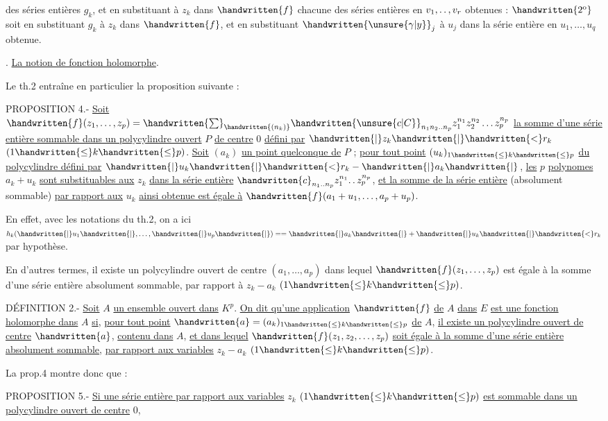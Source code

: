  des séries entières $g_k$, et en substituant à $z_k$ dans $\handwritten{f}$ chacune des séries entières en $v_1,\ldotp\ldotp,v_r$ obtenues : $\handwritten{2^{\mathrm{o}}}$ soit en substituant $g_k$ à $z_k$ dans $\handwritten{f}$, et en substituant $\handwritten{\unsure{\gamma|y}}_j$ à $u_j$ dans la série entière en $u_1,\ldots,u_q$ obtenue.

\uline{}. \uline{La notion de fonction holomorphe}.

Le th.2 entraîne en particulier la proposition suivante :

PROPOSITION 4.- \uline{Soit} $\handwritten{f}(z_1,\ldots,z_p)=\handwritten{\sum}_{\handwritten{(n_k)}}\handwritten{\unsure{c|C}}_{n_1n_2\ldotp\ldotp n_p}z_1^{n_1}z_2^{n_2}\ldots z_p^{n_p}$ \uline{la somme d'une série entière sommable dans un polycylindre ouvert} $P$ \uline{de centre} $0$ \uline{défini par} $\handwritten{|}z_k\handwritten{|}\handwritten{<}r_k$ $(1\handwritten{\leq}k\handwritten{\leq}p)$. \uline{Soit} $(a_k)$ \uline{un point quelconque de} $P$ ; \uline{pour tout point} $(u_k)_{1\handwritten{\leq}k\handwritten{\leq}p}$ \uline{du polycylindre défini par} $\handwritten{|}u_k\handwritten{|}\handwritten{<}r_k-\handwritten{|}a_k\handwritten{|}$, \uline{les} $p$ \uline{polynomes} $a_k+u_k$ \uline{sont substituables aux} $z_k$ \uline{dans la série entière} $\handwritten{c}_{n_1\ldotp\ldotp n_p}z_1^{n_1}\ldotp\ldotp z_p^{n_p}$, \uline{et la somme de la série entière} (absolument sommable) \uline{par rapport aux} $u_k$ \uline{ainsi obtenue est égale à} $\handwritten{f}(a_1+u_1,\ldots,a_p+u_p)$.

En effet, avec les notations du th.2, on a ici $h_k(\handwritten{|}u_1\handwritten{|},\ldots,\handwritten{|}u_p\handwritten{|})==\handwritten{|}a_k\handwritten{|}+\handwritten{|}u_k\handwritten{|}\handwritten{<}r_k$ par hypothèse.

En d'autres termes, il existe un polycylindre ouvert de centre $(a_1,\ldots,a_p)$ dans lequel $\handwritten{f}(z_1,\ldots,z_p)$ est égale à la somme d'une série entière absolument sommable, par rapport à $z_k-a_k$ $(1\handwritten{\leq}k\handwritten{\leq}p)$.

DÉFINITION 2.- \uline{Soit} $A$ \uline{un ensemble ouvert dans} ${K}^{p}$. \uline{On dit qu'une application} $\handwritten{f}$ \uline{de} $A$ \uline{dans} $E$ \uline{est une fonction holomorphe dans} $A$ \uline{si}, \uline{pour tout point} $\handwritten{a}=(a_k)_{1\handwritten{\leq}k\handwritten{\leq}p}$ \uline{de} $A$, \uline{il existe un polycylindre ouvert de centre} $\handwritten{a}$, \uline{contenu dans} $A$, \uline{et dans lequel} $\handwritten{f}(z_1,z_2,\ldots,z_p)$ \uline{soit égale à la somme d'une série entière absolument sommable}, \uline{par rapport aux variables} $z_k-a_k$ $(1\handwritten{\leq}k\handwritten{\leq}p)$.

La prop.4 montre donc que :

PROPOSITION 5.- \uline{Si une série entière par rapport aux variables} $z_k$ $(1\handwritten{\leq}k\handwritten{\leq}p)$ \uline{est sommable dans un polycylindre ouvert de centre} $0$,
